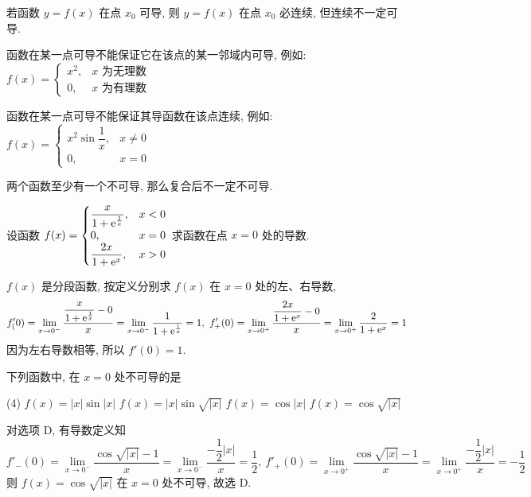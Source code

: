 \begin{theorem}[函数的可导性与连续性]
    若函数 $y=f(x)$ 在点 $x_0$ 可导, 则 $y=f(x)$ 在点 $x_0$ 必连续, 但连续不一定可导.

    函数在某一点可导不能保证它在该点的某一邻域内可导, 例如: $f(x)=\begin{cases}
            x^2, & x\text{ 为无理数} \\
            0,   & x\text{ 为有理数}
        \end{cases}$

    函数在某一点可导不能保证其导函数在该点连续, 例如: $f(x)=\begin{cases}
            x^2\sin\dfrac{1}{x}, & x\neq0 \\
            0,                   & x=0
        \end{cases}$

    两个函数至少有一个不可导, 那么复合后不一定不可导.
\end{theorem}

\begin{example}
    设函数 $f(x)=\begin{cases}
            \dfrac{x}{1+\mathrm{e} ^{\frac{1}{x}}}, & x<0 \\0,&x=0\\ \dfrac{2x}{1+\mathrm{e}^x},&x>0
        \end{cases}$ 求函数在点 $x=0$ 处的导数.
\end{example}
\begin{solution}
    $f(x)$ 是分段函数, 按定义分别求 $f(x)$ 在 $x=0$ 处的左、右导数,
    $$f'_(0)=\lim_{x\to0^-}\dfrac{\dfrac{x}{1+\mathrm{e} ^{\frac{1}{x}}}-0}{x}=\lim_{x\to0 ^-}\dfrac{1}{1+\mathrm{e} ^{\frac{1}{x}}}=1,~f'_+(0)=\lim_{x\to0^+}\dfrac{\dfrac{2x}{1+\mathrm{e}^x}-0}{x}=\lim_{x\to0^+}\dfrac{2}{1+\mathrm{e}^x}=1$$
    因为左右导数相等, 所以 $f'(0)=1$.
\end{solution}

\begin{example}[2018 数一]
    下列函数中, 在 $x=0$ 处不可导的是
    \begin{tasks}(4)
        \task $f(x)=|x|\sin |x|$
        \task $f(x)=|x|\sin \sqrt{|x|}$
        \task $f(x)=\cos |x|$
        \task $f(x)=\cos \sqrt{|x|}$
    \end{tasks}
\end{example}
\begin{solution}
    对选项 D, 有导数定义知
    $$f'_-(0)=\lim_{x\to0^-}\dfrac{\cos\sqrt{|x|}-1}{x}=\lim_{x\to0^-}\dfrac{-\dfrac{1}{2}|x|}{x}=\dfrac{1}{2},~f'_+(0)=\lim_{x\to0^+}\dfrac{\cos\sqrt{|x|}-1}{x}=\lim_{x\to0^+}\dfrac{-\dfrac{1}{2}|x|}{x}=-\dfrac{1}{2}$$
    则 $f(x)=\cos \sqrt{|x|}$ 在 $x=0$ 处不可导, 故选 D.
\end{solution}



